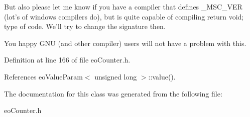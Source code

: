 But also please let me know if you have a compiler that defines \_\-MSC\_\-VER (lot's of windows compilers do), but is quite capable of compiling return void; type of code. We'll try to change the signature then.

You happy GNU (and other compiler) users will not have a problem with this. 

Definition at line 166 of file eo\-Counter.h.

References eo\-Value\-Param$<$ unsigned long $>$::value().

The documentation for this class was generated from the following file:\begin{CompactItemize}
\item 
eo\-Counter.h\end{CompactItemize}
